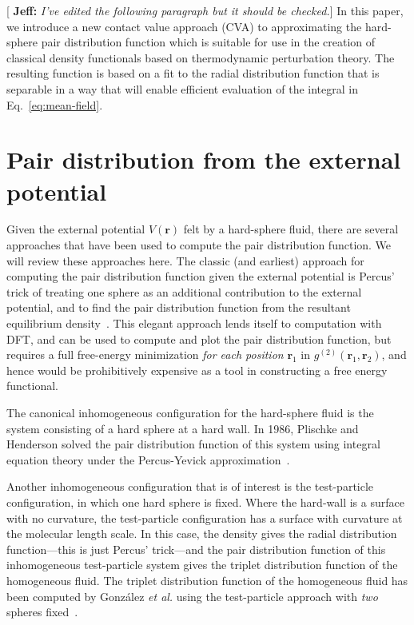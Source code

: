\documentclass[letterpaper,twocolumn,amsmath,amssymb,pre,aps,10pt]{revtex4-1}
\newcommand{\cyan}[1]{{\bf \color{cyan} #1}}
\newcommand{\rr}{\textbf{r}}
\newcommand{\jeffsays}[1]{{\color{red} [\cyan{Jeff:} \emph{#1}]}}
\begin{document}
\jeffsays{I've edited the following paragraph but it should be
  checked.}  In this paper, we introduce a new contact value approach
(CVA) to approximating the hard-sphere pair distribution function
which is suitable for use in the creation of classical density
functionals based on thermodynamic perturbation theory. The resulting
function is based on a fit to the radial distribution function that is
separable in a way that will enable efficient evaluation of the
integral in Eq.~\ref{eq:mean-field}.

\section{Pair distribution from the external potential}\label{sec:gV}

Given the external potential $V(\rr)$ felt by a hard-sphere fluid,
there are several approaches that have been used to compute the pair
distribution function.  We will review these approaches here.  The
classic (and earliest) approach for computing the pair distribution
function given the external potential is Percus' trick of treating one
sphere as an additional contribution to the external potential, and to
find the pair distribution function from the resultant equilibrium
density~\cite{hansen2006theory}.  This elegant approach lends itself
to computation with DFT, and can be used to compute and plot the pair
distribution function, but requires a full free-energy minimization
\emph{for each position} $\rr_1$ in $g^{(2)}(\rr_1,\rr_2)$, and hence
would be prohibitively expensive as a tool in constructing a free
energy functional.

The canonical inhomogeneous configuration for the hard-sphere fluid is
the system consisting of a hard sphere at a hard wall.  In 1986,
Plischke and Henderson solved the pair distribution function of this
system using integral equation theory under the Percus-Yevick
approximation~\cite{plischke1986pair}.

Another inhomogeneous configuration that is of interest is the
test-particle configuration, in which one hard sphere is fixed.  Where
the hard-wall is a surface with no curvature, the test-particle
configuration has a surface with curvature at the molecular length
scale.  In this case, the density gives the radial distribution
function---this is just Percus' trick---and the pair distribution
function of this inhomogeneous test-particle system gives the triplet
distribution function of the homogeneous fluid.  The triplet
distribution function of the homogeneous fluid has been computed by
Gonz\'alez \emph{et al.} using the test-particle approach with
\emph{two} spheres fixed~\cite{gonzalez1999test}.
\end{document}
